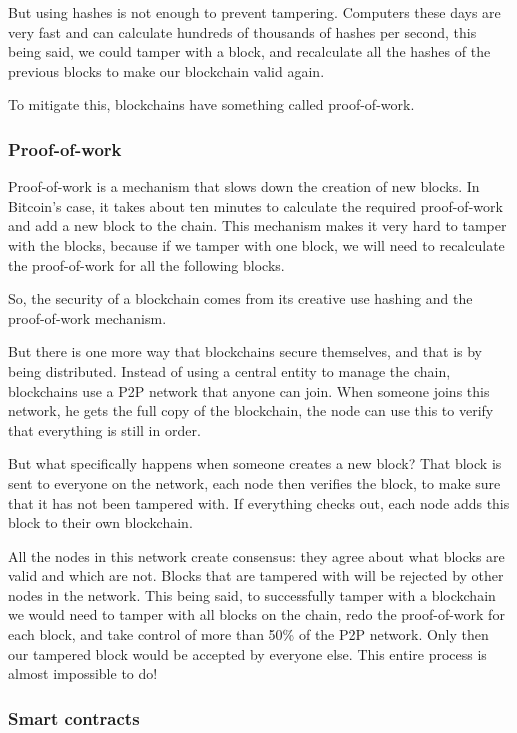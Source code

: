 \documentclass{article}
\newcommand\tab[1][1cm]{\hspace*{#1}}
\begin{document}
But using hashes is not enough to prevent tampering. Computers these days are very fast and can calculate hundreds of thousands of hashes per second, this being said, we could tamper with a block, and recalculate all the hashes of the previous blocks to make our blockchain valid again.

To mitigate this, blockchains have something called proof-of-work.

\subsubsection{Proof-of-work}

\tab Proof-of-work is a mechanism that slows down the creation of new blocks. In Bitcoin's case, it takes about ten minutes to calculate the required proof-of-work and add a new block to the chain. This mechanism makes it very hard to tamper with the blocks, because if we tamper with one block, we will need to recalculate the proof-of-work for all the following blocks.

So, the security of a blockchain comes from its creative use hashing and the proof-of-work mechanism.

But there is one more way that blockchains secure themselves, and that is by being distributed. Instead of using a central entity to manage the chain, blockchains use a P2P network that anyone can join. When someone joins this network, he gets the full copy of the blockchain, the node can use this to verify that everything is still in order.

But what specifically happens when someone creates a new block? That block is sent to everyone on the network, each node then verifies the block, to make sure that it has not been tampered with. If everything checks out, each node adds this block to their own blockchain. 

All the nodes in this network create consensus: they agree about what blocks are valid and which are not. Blocks that are tampered with will be rejected by other nodes in the network. This being said, to successfully tamper with a blockchain we would need to tamper with all blocks on the chain, redo the proof-of-work for each block, and take control of more than 50\% of the P2P network. Only then our tampered block would be accepted by everyone else. This entire process is almost impossible to do!

\subsubsection{Smart contracts}
\end{document}
